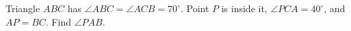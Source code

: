 Triangle $ABC$ has $\angle ABC=\angle ACB=70^\circ$. Point $P$ is inside it, $\angle PCA=40^\circ$, and $AP=BC$. Find $\angle PAB$.
